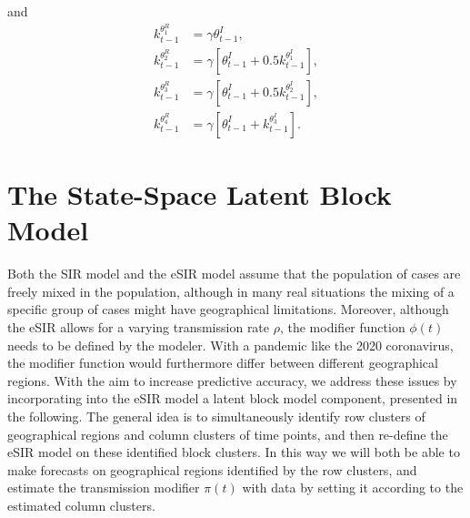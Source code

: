 \documentclass[10pt,a4paper]{article}
\begin{document}
%
and 
%
\begin{equation*}
	\begin{split}	
		k_{t-1}^{\theta^R_1} &= \gamma \theta^I_{t-1}, \\
		k_{t-1}^{\theta^R_2} &= \gamma[\theta_{t-1}^I + 0.5 k_{t-1}^{\theta^I_1}], \\
		k_{t-1}^{\theta^R_3} &= \gamma[\theta_{t-1}^I + 0.5 k_{t-1}^{\theta^I_2}], \\
		k_{t-1}^{\theta^R_4} &= \gamma[\theta_{t-1}^I + k_{t-1}^{\theta^I_3}]. 
	\end{split}
\end{equation*}
%	






\section{The State-Space Latent Block Model}
Both the SIR model and the eSIR model assume that the population of cases are freely mixed in the population, although in many real situations the mixing of a specific group of cases might have geographical limitations. Moreover, although the eSIR allows for a varying transmission rate $\rho$, the modifier function $\phi(t)$ needs to be defined by the modeler. With a pandemic like the 2020 coronavirus, the modifier function would furthermore differ between different geographical regions. With the aim to increase predictive accuracy, we address these issues by incorporating into the eSIR model a latent block model component, presented in the following. The general idea is to simultaneously identify row clusters of geographical regions and column clusters of time points, and then re-define the eSIR model on these identified block clusters. In this way we will both be able to make forecasts on geographical regions identified by the row clusters, and estimate the transmission modifier $\pi(t)$ with data by setting it according to the estimated column clusters.
 
\end{document}
